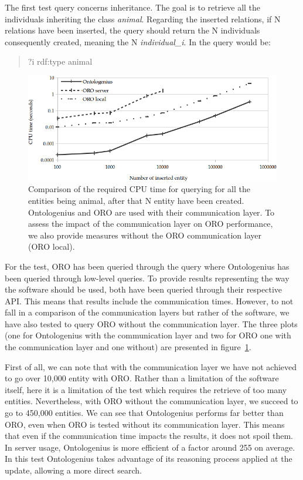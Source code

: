 The first test query concerns inheritance. The goal is to retrieve all the individuals inheriting the class \textit{animal}. Regarding the inserted relations, if N relations have been inserted, the query should return the N individuals consequently created, meaning the N \textit{individual\_i}. In \sparql{} the query would be:

\begin{quote} 
\centering 
?i rdf:type animal
\end{quote}

\begin{figure}[ht!]
\centering
\includegraphics[width=\textwidth]{figures/chapter2/oro/R1.png}
\caption{\label{fig:chap2_oro_r1}Comparison of the required CPU time for querying for all the entities being animal, after that N entity have been created. Ontologenius and ORO are used with their communication layer. To assess the impact of the communication layer on ORO performance, we also provide measures without the ORO communication layer (ORO local).}
\end{figure}

For the test, ORO has been queried through the \sparql{} query where Ontologenius has been queried through low-level queries. To provide results representing the way the software should be used, both have been queried through their respective API. This means that results include the communication times. However, to not fall in a comparison of the communication layers but rather of the software, we have also tested to query ORO without the communication layer. The three plots (one for Ontologenius with the communication layer and two for ORO one with the communication layer and one without) are presented in figure~\ref{fig:chap2_oro_r1}.

First of all, we can note that with the communication layer we have not achieved to go over 10,000 entity with ORO. Rather than a limitation of the software itself, here it is a limitation of the test which requires the retrieve of too many entities. Nevertheless, with ORO without the communication layer, we succeed to go to 450,000 entities. We can see that Ontologenius performs far better than ORO, even when ORO is tested without its communication layer. This means that even if the communication time impacts the results, it does not spoil them. In server usage, Ontologenius is more efficient of a factor around 255 on average. In this test Ontologenius takes advantage of its reasoning process applied at the update, allowing a more direct search.

